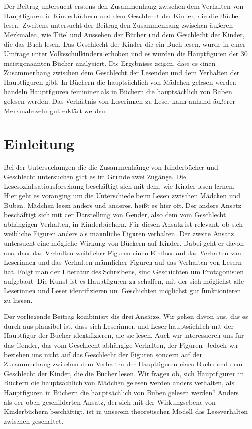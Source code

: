 \begin{abstact}
  Der Beitrag untersucht erstens den Zusammenhang zwischen dem Verhalten von Hauptfiguren in Kinderbüchern und dem Geschlecht der Kinder, die die Bücher lesen.
  Zweitens untersucht der Beitrag den Zusammenhang zwischen äußeren Merkmalen, wie Titel und Aussehen der  Bücher und dem Geschlecht der Kinder, die das Buch lesen.
  Das Geschlecht der Kinder die ein Buch lesen, wurde in einer Umfrage unter Volksschulkindern erhoben und es wurden die Hauptfiguren der 30 meistgenannten Bücher analysiert.
  Die Ergebnisse zeigen, dass es einen Zusammenhang zwischen dem Geschlecht der Lesenden und dem Verhalten der Hauptfiguren gibt.
  In Büchern die hauptsächlich von Mädchen gelesen werden handeln Hauptfiguren femininer als in Büchern die hauptsächlich von Buben gelesen werden.
  Das Verhältnis von Leserinnen zu Leser kann anhand äußerer Merkmale sehr gut erklärt werden.
\end{abstact}

\section{Einleitung} %
\label{sec:einleitung}

Bei der Untersuchungen die die Zusammenhänge von Kinderbücher und Geschlecht untersuchen gibt es im Grunde zwei Zugänge.
Die Lesesozialisationsforschung beschäftigt sich mit dem, wie Kinder lesen lernen.
Hier geht es voranging um die Unterschiede beim Lesen zwischen Mädchen und Buben.
Mädchen lesen anders und anderes, heißt es hier oft.
Der andere Ansatz beschäftigt sich mit der Darstellung von Gender, also dem vom Geschlecht abhängigen Verhalten, in Kinderbüchern.
Für diesen Ansatz ist relevant, ob sich weibliche Figuren anders als männliche Figuren verhalten.
Der zweite Ansatz untersucht eine mögliche Wirkung von Büchern auf Kinder.
Dabei geht er davon aus, dass das Verhalten weiblicher Figuren einen Einfluss auf das Verhalten von Leserinnen und das Verhalten männlicher Figuren auf das Verhalten von Lesern hat.
Folgt man der Literatur des Schreibens, sind Geschichten um Protagonisten aufgebaut.
Die Kunst ist es Hauptfiguren zu schaffen, mit der sich möglichst alle Leserinnen und Leser identifizieren um Geschichten möglichst gut funktionieren zu lassen.

Der vorliegende Beitrag kombiniert die drei Ansätze.
Wir gehen davon aus, das es durch aus plausibel ist, dass sich Leserinnen und Leser hauptsächlich mit der Hauptfigur der Bücher identifizieren, die sie lesen.
Auch wir interessieren uns für das Gender, das vom Geschlecht abhängige Verhalten, der Figuren.
Jedoch wir beziehen uns nicht auf das Geschlecht der Figuren sondern auf den Zusammenhang zwischen dem Verhalten der Hauptfiguren eines Buchs und dem Geschlecht der Kinder, die die Bücher lesen.
Wir fragen ob, sich Hauptfiguren in Büchern die hauptsächlich von Mädchen gelesen werden anders verhalten, als Hauptfiguren in Büchern die hauptsächlich von Buben gelesen werden?
Anders als der oben geschilderten Ansatz, der sich mit der Wirkungsebene von Kinderbüchern beschäftigt, ist in unserem theoretischen Modell das Leseverhalten zwischen geschaltet.



